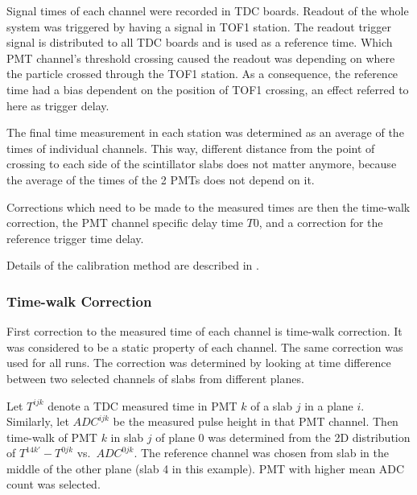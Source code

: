 Signal times of each channel were recorded in TDC boards. Readout of
the whole system was triggered by having a signal in TOF1 station. The
readout trigger signal is distributed to all TDC boards and is used as
a reference time. Which PMT channel's threshold crossing caused the
readout was depending on where the particle crossed through the TOF1
station. As a consequence, the reference time had a bias dependent on
the position of TOF1 crossing, an effect referred to here as trigger
delay.

The final time measurement in each station was determined as an average of
the times of individual channels. This way, different distance from
the point of crossing to each side of the scintillator slabs does not
matter anymore, because the average of the times of the 2 PMTs does
not depend on it.

Corrections which need to be made to the measured times are then the
time-walk correction, the PMT channel specific delay time $T0$, and
a correction for the reference trigger time delay.

Details of the calibration method are described in \cite{NOTE251}.


\subsubsection{Time-walk Correction}

First correction to the measured time of each channel is time-walk
correction. It was considered to be a static property of each
channel. The same correction was used for all runs. The correction was
determined by looking at time difference between two selected channels
of slabs from different planes.

Let $T^{ijk}$ denote a TDC measured time in PMT $k$ of a slab $j$ in a
plane $i$. Similarly, let $ADC^{ijk}$ be the measured pulse height in
that PMT channel. Then time-walk of PMT $k$ in slab $j$ of plane 0 was
determined from the 2D distribution of $T^{14k'} - T^{0jk}$
vs.~$ADC^{0jk}$. The reference channel was chosen from slab in the middle
of the other plane (slab 4 in this example). PMT with higher mean ADC
count was selected.

